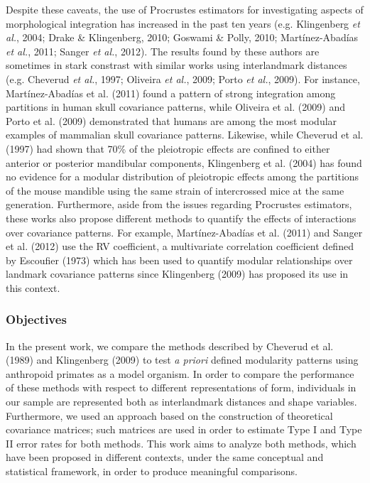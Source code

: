 \documentclass[12pt,twoside]{report}
\begin{document}
Despite these caveats, the use of Procrustes estimators for
investigating aspects of morphological integration has increased in the
past ten years (e.g. Klingenberg \emph{et al.}, 2004; Drake \&
Klingenberg, 2010; Goswami \& Polly, 2010; Martínez-Abadías \emph{et
al.}, 2011; Sanger \emph{et al.}, 2012). The results found by these
authors are sometimes in stark constrast with similar works using
interlandmark distances (e.g. Cheverud \emph{et al.}, 1997; Oliveira
\emph{et al.}, 2009; Porto \emph{et al.}, 2009). For instance,
Martínez-Abadías et al. (2011) found a pattern of strong integration
among partitions in human skull covariance patterns, while Oliveira et
al. (2009) and Porto et al. (2009) demonstrated that humans are among
the most modular examples of mammalian skull covariance patterns.
Likewise, while Cheverud et al. (1997) had shown that 70\% of the
pleiotropic effects are confined to either anterior or posterior
mandibular components, Klingenberg et al. (2004) has found no evidence
for a modular distribution of pleiotropic effects among the partitions
of the mouse mandible using the same strain of intercrossed mice at the
same generation. Furthermore, aside from the issues regarding Procrustes
estimators, these works also propose different methods to quantify the
effects of interactions over covariance patterns. For example,
Martínez-Abadías et al. (2011) and Sanger et al. (2012) use the RV
coefficient, a multivariate correlation coefficient defined by Escoufier
(1973) which has been used to quantify modular relationships over
landmark covariance patterns since Klingenberg (2009) has proposed its
use in this context.

\subsubsection{Objectives}\label{objectives}

In the present work, we compare the methods described by Cheverud et al.
(1989) and Klingenberg (2009) to test \emph{a priori} defined modularity
patterns using anthropoid primates as a model organism. In order to
compare the performance of these methods with respect to different
representations of form, individuals in our sample are represented both
as interlandmark distances and shape variables. Furthermore, we used an
approach based on the construction of theoretical covariance matrices;
such matrices are used in order to estimate Type I and Type II error
rates for both methods. This work aims to analyze both methods, which
have been proposed in different contexts, under the same conceptual and
statistical framework, in order to produce meaningful comparisons.
\end{document}
